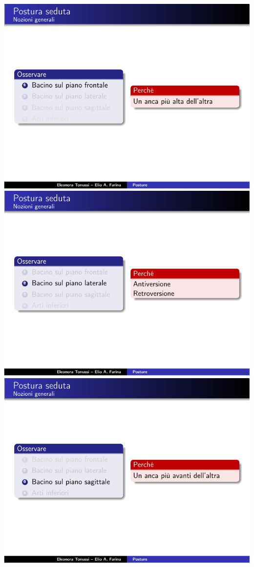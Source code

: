     \clearpage
    \begin{center}
        \includegraphics[width=0.81\linewidth]{./Beamer/Page6.pdf}\\
        \vfill
        \includegraphics[width=0.81\linewidth]{./Beamer/Page7.pdf}\\
        \vfill
        \includegraphics[width=0.81\linewidth]{./Beamer/Page8.pdf}
    \end{center}

